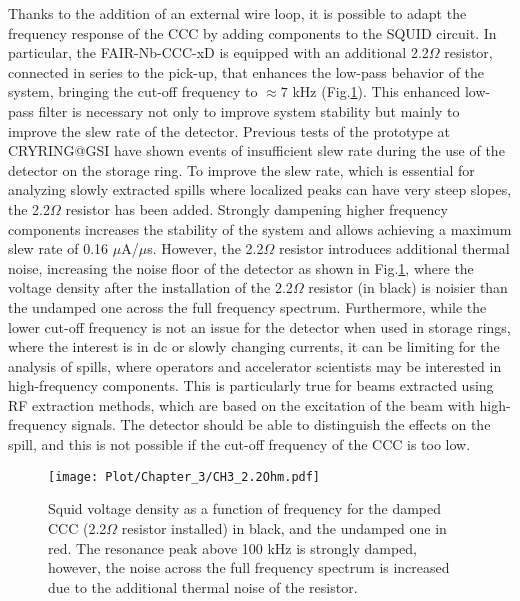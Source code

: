 \documentclass[12pt,a4paper]{report}
\begin{document}
       Thanks to the addition of an external wire loop, it is possible to adapt the frequency response of the CCC by adding components to the SQUID circuit. In particular, the FAIR-Nb-CCC-xD is equipped with an additional 2.2\(\Omega\) resistor, connected in series to the pick-up, that enhances the low-pass behavior of the system, bringing the cut-off frequency to \(\approx 7\) kHz (Fig.\ref{CH3_2.2Ohm}). This enhanced low-pass filter is necessary not only to improve system stability but mainly to improve the slew rate of the detector. Previous tests of the prototype at CRYRING@GSI \cite{DavidThesis} have shown events of insufficient slew rate during the use of the detector on the storage ring. To improve the slew rate, which is essential for analyzing slowly extracted spills where localized peaks can have very steep slopes, the 2.2\(\Omega\) resistor has been added. Strongly dampening higher frequency components increases the stability of the system and allows achieving a maximum slew rate of 0.16 \(\mu\)A/\(\mu\)s. However, the 2.2\(\Omega\) resistor introduces additional thermal noise, increasing the noise floor of the detector as shown in Fig.\ref{CH3_2.2Ohm}, where the voltage density after the installation of the 2.2\(\Omega\) resistor (in black) is noisier than the undamped one across the full frequency spectrum. Furthermore, while the lower cut-off frequency is not an issue for the detector when used in storage rings, where the interest is in dc or slowly changing currents, it can be limiting for the analysis of spills, where operators and accelerator scientists may be interested in high-frequency components. This is particularly true for beams extracted using RF extraction methods, which are based on the excitation of the beam with high-frequency signals. The detector should be able to distinguish the effects on the spill, and this is not possible if the cut-off frequency of the CCC is too low.
       
       \begin{figure}[H]
       	\centering
       	\texttt{[image: Plot/Chapter\_3/CH3\_2.2Ohm.pdf]}
       	\caption{\small{Squid voltage density as a function of frequency for the damped CCC (2.2\(\Omega\) resistor installed) in black, and the undamped one in red. The resonance peak above 100 kHz is strongly damped, however, the noise across the full frequency spectrum is increased due to the additional thermal noise of the resistor.}}
       	\label{CH3_2.2Ohm}
       \end{figure}
       
\end{document}
